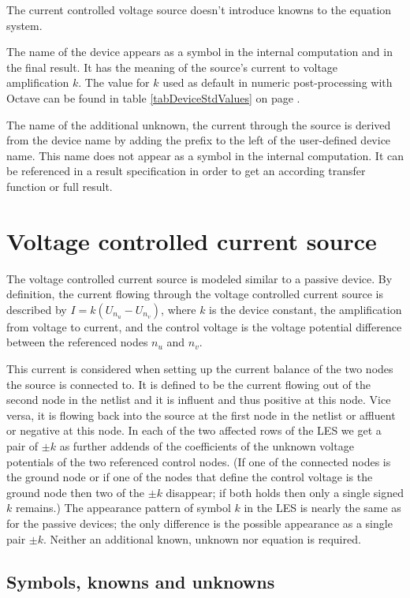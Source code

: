 The current controlled voltage source doesn't introduce knowns to the
equation system.

The name of the device appears as a symbol in the internal computation and
in the final result. It has the meaning of the source's current to voltage
amplification $k$. The value for $k$ used as default in numeric
post-processing with Octave can be found in table \ref{tabDeviceStdValues}
on page \pageref{tabDeviceStdValues}.

The name of the additional unknown, the current through the source is
derived from the device name by adding the prefix  to the left
of the user-defined device name. This name does not appear as a symbol in
the internal computation. It can be referenced in a result specification
in order to get an according transfer function or full result.


\section{Voltage controlled current source}

The voltage controlled current source is modeled similar to a passive
device. By definition, the current flowing through the voltage controlled
current source is described by $I = k(U_{n_u} - U_{n_v})$, where $k$ is
the device constant, the amplification from voltage to current, and the
control voltage is the voltage potential difference between the referenced
nodes $n_u$ and $n_v$.

This current is considered when setting up the current balance of the two
nodes the source is connected to. It is defined to be the current flowing
out of the second node in the netlist and it is influent and thus positive
at this node. Vice versa, it is flowing back into the source at the first
node in the netlist or affluent or negative at this node. In each of the
two affected rows of the LES we get a pair of $\pm k$ as further addends
of the coefficients of the unknown voltage potentials of the two
referenced control nodes. (If one of the connected nodes is the ground
node or if one of the nodes that define the control voltage is the ground
node then two of the $\pm k$ disappear; if both holds then only a single
signed $k$ remains.) The appearance pattern of symbol $k$ in the LES is
nearly the same as for the passive devices; the only difference is the
possible appearance as a single pair $\pm k$. Neither an additional known,
unknown nor equation is required.


\subsection{Symbols, knowns and unknowns}

